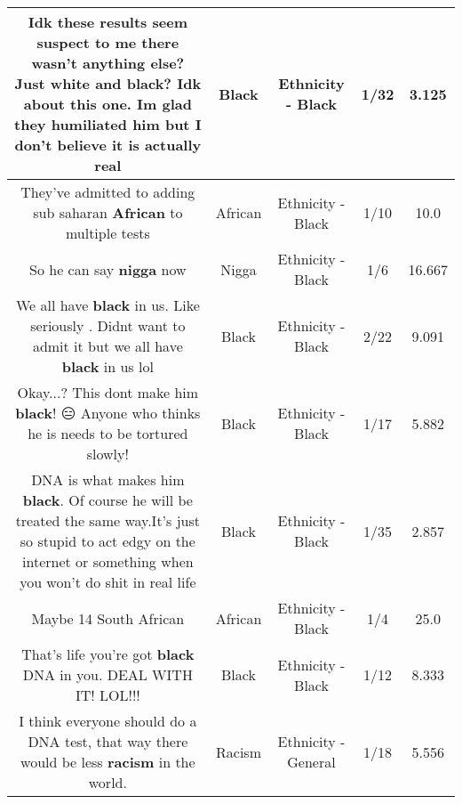 \documentclass[11pt]{article}
\newlength\mylength
\begin{document}
\begin{center}
\begin{longtable}{|C{.65\mylength}|C{.30\mylength}|C{.12\mylength}|C{.12\mylength}|C{.12\mylength}|}
  \small Idk these results seem suspect to me there wasn't anything else? Just white and \textbf{black}? Idk about this one. Im glad they humiliated him but I don't believe it is actually real\normalsize   & Black & Ethnicity - Black & 1/32 & 3.125 \\  \hline
  \small They've admitted to adding sub saharan \textbf{African} to multiple tests\normalsize   & African & Ethnicity - Black & 1/10 & 10.0 \\  \hline
  \small So he can say \textbf{nigga} now\normalsize   & Nigga & Ethnicity - Black & 1/6 & 16.667 \\  \hline
  \small We all have \textbf{black} in us. Like seriously . Didnt want to admit it but we all have \textbf{black} in us lol\normalsize   & Black & Ethnicity - Black & 2/22 & 9.091 \\  \hline
  \small Okay...? This dont make him \textbf{black}! 😑 Anyone who thinks he is needs to be tortured slowly!\normalsize   & Black & Ethnicity - Black & 1/17 & 5.882 \\  \hline
  \small DNA is what makes him \textbf{black}. Of course he will be treated the same way.It's just so stupid to act edgy on the internet or something when you won't do shit in real life\normalsize   & Black & Ethnicity - Black & 1/35 & 2.857 \\  \hline
  \small Maybe 14 South African\normalsize   & African & Ethnicity - Black & 1/4 & 25.0 \\  \hline
  \small That's life you're got \textbf{black} DNA in you. DEAL WITH IT! LOL!!!\normalsize   & Black & Ethnicity - Black & 1/12 & 8.333 \\  \hline
  \small I think everyone should do a DNA test, that way there would be less \textbf{racism} in the world.\normalsize   & Racism & Ethnicity - General & 1/18 & 5.556 \\  \hline

\end{longtable}
\end{center}
\end{document}
